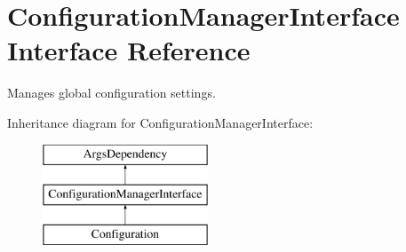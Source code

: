 \hypertarget{interfaceConfigurationManagerInterface}{\section{Configuration\-Manager\-Interface Interface Reference}
\label{interfaceConfigurationManagerInterface}
}


Manages global configuration settings.  


Inheritance diagram for Configuration\-Manager\-Interface\-:\begin{figure}[H]
\begin{center}
\leavevmode
\includegraphics[height=3.000000cm]{interfaceConfigurationManagerInterface}
\end{center}
\end{figure}

